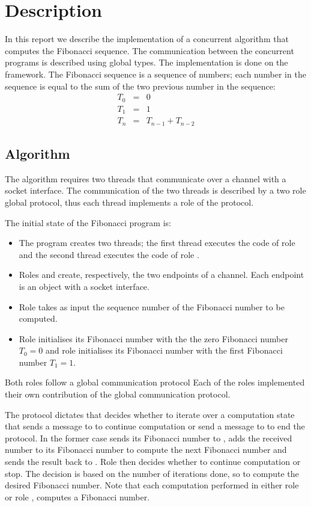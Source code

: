 \section{Description}

In this report we describe the implementation of a
concurrent algorithm that computes the Fibonacci
sequence. The communication between the concurrent 
programs is described using global types.
The implementation is done on the \Mungo framework.
The Fibonacci sequence is a sequence of numbers;
each number in the sequence is equal to the sum
of the two previous number in the sequence:
%
\begin{eqnarray*}
	T_0 &=& 0 \\
	T_1 &=& 1\\
	T_n &=& T_{n-1} + T_{n-2}
\end{eqnarray*}

\subsection{Algorithm}
\label{subsec:algorithm}
The algorithm requires two threads that communicate
over a channel with a socket interface.
The communication of the two threads is described by a
two role global protocol, thus each thread implements
a role of the protocol.

The initial state of the Fibonacci program is:
%
\begin{itemize}
	\item	The program creates two threads; the first thread
			executes the code of role \A and the second thread
			executes the code of role \B.

	\item	Roles \A and \B create, respectively,
			the two endpoints of a channel. Each endpoint
			is an object with a socket interface.

	\item	Role \A takes as input the sequence number
			of the Fibonacci number to be computed.

	\item	Role \A initialises its Fibonacci number
			with the
			the zero Fibonacci number $T_0 = 0$ and 
			role \B initialises its Fibonacci number with
			the first Fibonacci number $T_1 = 1$.
\end{itemize}

Both roles follow a global communication protocol
Each of the roles implemented their own contribution
of the global communication protocol.

The protocol dictates that \A decides whether to iterate over a computation
state that sends a message to \B to continue computation or send a message to \B
to end the protocol.
In the former case \A sends its Fibonacci number to \B, \B adds
the received number to its Fibonacci number to 
compute the next Fibonacci number and sends the result back to \A.
Role \A then decides whether to continue computation or stop. The decision
is based on the number of iterations done, so to compute the desired Fibonacci number.
Note that each computation performed in either role \A or role \B, computes a
Fibonacci number.


